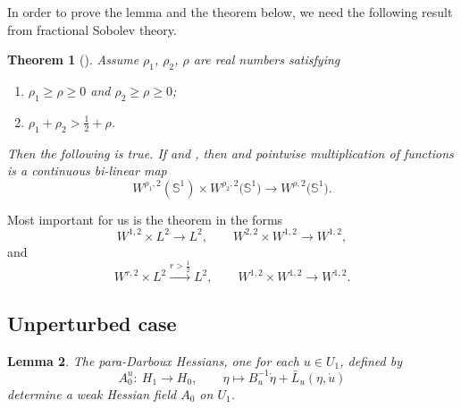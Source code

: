 \documentclass[pdftex]{sigma}
\numberwithin{equation}{section}
\newtheorem{Theorem}{Theorem}[section]
\newtheorem{Lemma}[Theorem]{Lemma}
\renewcommand{\SS}{{\mathbb{S}}}
\newcommand{\1}{{{\mathchoice {\rm 1\mskip-4mu l} {\rm 1\mskip-4mu l}
{\rm 1\mskip-4.5mu l} {\rm 1\mskip-5mu l}}}}
\begin{document}
In order to prove the lemma and the theorem below,
we need the following result from fractional Sobolev theory.

\begin{Theorem}[{\cite[Theorem~7.4]{Behzadan:2021a}}]
Assume $\rho_1$, $\rho_2$, $\rho$ are real numbers satisfying
\begin{enumerate}\itemsep=0pt
\item[$(1)$]
 $\rho_1\ge \rho\ge 0$ and $\rho_2\ge \rho\ge 0$;
\item[$(2)$]
 $\rho_1+\rho_2>\frac12 +\rho$.
\end{enumerate}
Then the following is true.
If \smash{$v\in W^{\rho_1,2}\bigl(\SS^1\bigr)$} and \smash{$w\in W^{\rho_2,2}\bigl(\SS^1\bigr)$}, then
\smash{$vw\in W^{\rho,2}\bigl(\SS^1\bigr)$} and pointwise multiplication of functions is a
continuous bi-linear map
\begin{equation*}
 W^{\rho_1,2}(\SS^1)\times W^{\rho_2,2}\bigl(\SS^1\bigr)\to W^{\rho,2}\bigl(\SS^1\bigr) .
\end{equation*}
\end{Theorem}

Most important for us is the theorem in the forms
\begin{equation}\label{eq:Behz-Hol-1}
 W^{1,2}\times L^2\to L^2
 ,\qquad
 W^{2,2}\times W^{1,2}\to W^{1,2}
 ,
\end{equation}
and
\begin{equation}\label{eq:Behz-Hol-2}
 W^{r,2}\times L^2\stackrel{r>\frac12}{\longrightarrow} L^2
 ,\qquad
 W^{1,2}\times W^{1,2}\to W^{1,2}
 .
\end{equation}

\subsection{Unperturbed case}

\begin{Lemma}\label{le:para-weak}
The para-Darboux Hessians, one for each $u\in U_1$, defined by
\[
 A_0^u\colon \ H_1\to H_0
 ,\qquad
 \eta\mapsto B_u^{-1}\dot \eta+\bar L_u(\eta,\dot u)
\]
determine a weak Hessian field $A_0$ on $U_1$.
\end{Lemma}
\end{document}
